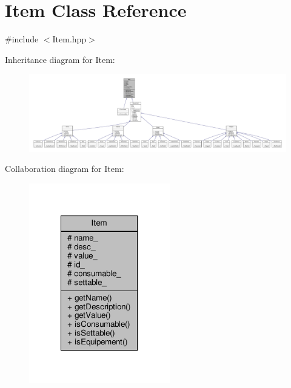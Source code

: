 \hypertarget{class_item}{\section{Item Class Reference}
\label{class_item}
}


{\ttfamily \#include $<$Item.\-hpp$>$}



Inheritance diagram for Item\-:
\nopagebreak
\begin{figure}[H]
\begin{center}
\leavevmode
\includegraphics[width=350pt]{class_item__inherit__graph}
\end{center}
\end{figure}


Collaboration diagram for Item\-:\nopagebreak
\begin{figure}[H]
\begin{center}
\leavevmode
\includegraphics[width=174pt]{class_item__coll__graph}
\end{center}
\end{figure}
